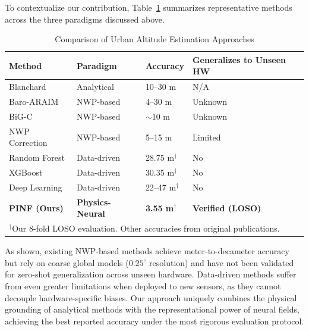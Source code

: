 To contextualize our contribution, Table~\ref{tab:related_comparison} summarizes representative methods across the three paradigms discussed above.

\begin{table}[t]
\caption{Comparison of Urban Altitude Estimation Approaches}
\label{tab:related_comparison}
\centering
\small
\begin{tabular}{p{2.2cm}p{1.5cm}p{1.2cm}p{1.5cm}}
\toprule
\textbf{Method} & \textbf{Paradigm} & \textbf{Accuracy} & \textbf{Generalizes to Unseen HW} \\
\midrule
Blanchard \cite{blanchard1971new} & Analytical & 10--30 m & N/A \\
Baro-ARAIM \cite{simonetti2024geodetic} & NWP-based & 4--30 m & Unknown \\
BiG-C \cite{narayanan2022enhanced} & NWP-based & ${\sim}10$ m & Unknown \\
NWP Correction \cite{schumann2017use} & NWP-based & 5--15 m & Limited \\
\midrule
Random Forest \cite{breiman2001random} & Data-driven & 28.75 m$^{\dagger}$ & No \\
XGBoost \cite{chen2016xgboost} & Data-driven & 30.35 m$^{\dagger}$ & No \\
Deep Learning \cite{chen2022deep} & Data-driven & 22--47 m$^{\dagger}$ & No \\
\midrule
\textbf{PINF (Ours)} & \textbf{Physics-Neural} & \textbf{3.55 m}$^{\dagger}$ & \textbf{Verified (LOSO)} \\
\bottomrule
\multicolumn{4}{l}{\footnotesize $^{\dagger}$Our 8-fold LOSO evaluation. Other accuracies from original publications.}
\end{tabular}
\end{table}

As shown, existing NWP-based methods achieve meter-to-decameter accuracy but rely on coarse global models ($0.25^{\circ}$ resolution) and have not been validated for zero-shot generalization across unseen hardware. Data-driven methods suffer from even greater limitations when deployed to new sensors, as they cannot decouple hardware-specific biases. Our approach uniquely combines the physical grounding of analytical methods with the representational power of neural fields, achieving the best reported accuracy under the most rigorous evaluation protocol.
